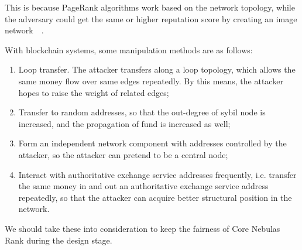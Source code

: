 This is because PageRank algorithms work based on the network topology, while the adversary could get the same or higher reputation score by creating an image network~\cite{cheng2005sybilproof}~\cite{cheng2006manipulability}.

With blockchain systems, some manipulation methods are as follows:
\begin{enumerate}
\item Loop transfer. The attacker transfers along a loop topology, which allows the same money flow over same edges repeatedly. By this means, the attacker hopes to raise the weight of related edges;
\item Transfer to random addresses, so that the out-degree of sybil node is increased, and the propagation of fund is increased as well;
\item Form an independent network component with addresses controlled by the attacker, so the attacker can pretend to be a central node;
\item Interact with authoritative exchange service addresses frequently, i.e. transfer the same money in and out an authoritative exchange service address repeatedly, so that the attacker can acquire better structural position in the network.
\end{enumerate}

We should take these into consideration to keep the fairness of Core Nebulas Rank during the design stage.


